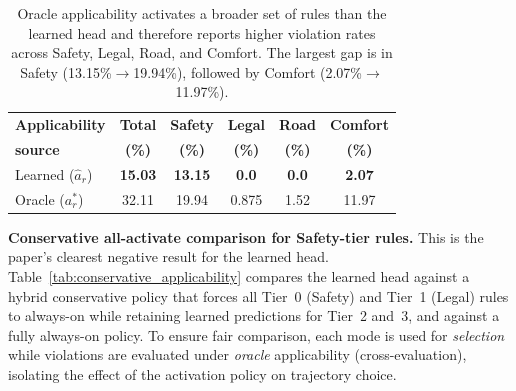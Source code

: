 \begin{table}[t]
\centering
\caption{Applicability-Source Ablation: Oracle vs.\ Learned (12{,}800 Scenarios, Lexicographic Selection)}
\label{tab:applicability_ablation}
\setlength{\tabcolsep}{3pt}
\begin{tabular}{lccccc}
\toprule
\textbf{Applicability} & \textbf{Total} & \textbf{Safety} & \textbf{Legal} & \textbf{Road} & \textbf{Comfort} \\
\textbf{source} & \textbf{(\%)} & \textbf{(\%)} & \textbf{(\%)} & \textbf{(\%)} & \textbf{(\%)} \\
\midrule
Learned ($\hat{a}_r$)  & \textbf{15.03} & \textbf{13.15} & \textbf{0.0} & \textbf{0.0} & \textbf{2.07} \\
Oracle ($a_r^*$)       & 32.11 & 19.94 & 0.875 & 1.52 & 11.97 \\
\bottomrule
\end{tabular}
\vspace{1mm}
\caption*{\footnotesize Oracle applicability activates a broader set of rules than the learned head and therefore reports higher violation rates across Safety, Legal, Road, and Comfort.  The largest gap is in Safety (13.15\%$\to$19.94\%), followed by Comfort (2.07\%$\to$11.97\%).}
\end{table}

\noindent\textbf{Conservative all-activate comparison for Safety-tier rules.}  This is the paper's clearest negative result for the learned head. Table~\ref{tab:conservative_applicability} compares the learned head against a hybrid conservative policy that forces all Tier~0 (Safety) and Tier~1 (Legal) rules to always-on while retaining learned predictions for Tier~2 and~3, and against a fully always-on policy.  To ensure fair comparison, each mode is used for \emph{selection} while violations are evaluated under \emph{oracle} applicability (cross-evaluation), isolating the effect of the activation policy on trajectory choice.

